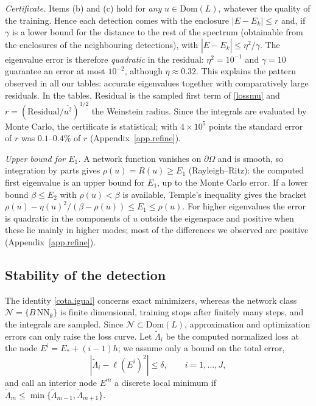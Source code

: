 \documentclass[10pt]{amsart}
\theoremstyle{definition}
\theoremstyle{remark}
\theoremstyle{plain}
\begin{document}
\emph{Certificate.} Items (b) and (c) hold for \emph{any} $u\in \mathrm{Dom}(L)$, whatever the quality of
the training. Hence each detection comes with the enclosure $|E-E_k|\le r$ and, if $\gamma$ is a lower
bound for the distance to the rest of the spectrum (obtainable from the enclosures of the
neighbouring detections), with $|\hat E-E_k|\le\eta^2/\gamma$. The eigenvalue error is therefore
\emph{quadratic} in the residual: $\eta^2=10^{-1}$ and $\gamma=10$ guarantee an error at most
$10^{-2}$, although $\eta\approx0.32$. This explains the pattern observed in all our tables: accurate
eigenvalues together with comparatively large residuals. In the tables, $\mathrm{Residual}$ is the
sampled first term of \eqref{lossmu} and $r=(\mathrm{Residual}/\overline{u^2})^{1/2}$ the Weinstein
radius. Since the integrals are evaluated by Monte Carlo, the certificate is statistical; with
$4\times10^5$ points the standard error of $r$ was $0.1$--$0.4\%$ of $r$
(Appendix~\ref{app.refine}).

\emph{Upper bound for $E_1$.} A network function vanishes on $\partial\Omega$ and is smooth, so
integration by parts gives $\rho(u)=R(u)\ge E_1$ (Rayleigh--Ritz): the computed first eigenvalue is
an upper bound for $E_1$, up to the Monte Carlo error. If a lower bound $\beta\le E_2$ with
$\rho(u)<\beta$ is available, Temple's inequality \cite{Kato1949} gives the bracket
$\rho(u)-\eta(u)^2/(\beta-\rho(u))\le E_1\le\rho(u)$. For higher eigenvalues the error is quadratic in the
components of $u$ outside the eigenspace and positive when these lie mainly in higher modes; most of
the differences we observed are positive (Appendix~\ref{app.refine}).

\subsection{Stability of the detection}\label{sec.stability}
The identity \eqref{cota.igual} concerns exact minimizers, whereas the network class
$\mathcal N=\{B\,\mathrm{NN}_\theta\}$ is finite dimensional, training stops after finitely many steps,
and the integrals are sampled. Since $\mathcal N\subset\mathrm{Dom}(L)$, approximation and optimization
errors can only raise the loss curve. Let $\tilde\Lambda_i$ be the computed normalized loss at the node
$E^i=E_*+(i-1)h$; we assume only a bound on the total error,
\begin{equation}\label{hyp.delta}
|\tilde\Lambda_i-\ell(E^i)^2|\le\delta,\qquad i=1,\dots,J,
\end{equation}
and call an interior node $E^m$ a discrete local minimum if
$\tilde\Lambda_m\le\min\{\tilde\Lambda_{m-1},\tilde\Lambda_{m+1}\}$.
\end{document}
